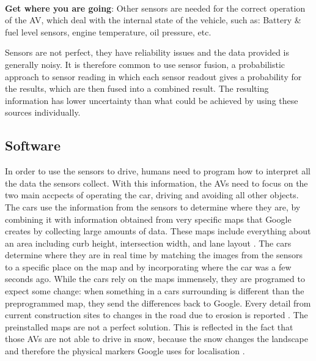 \documentclass[11pt]{article}
\begin{document}
$~$\\
\textbf{Get where you are going}:
Other sensors are needed for the correct operation of the AV, which deal with the internal state of the vehicle, such as: Battery \& fuel level sensors, engine temperature, oil pressure, etc.

Sensors are not perfect, they have reliability issues and the data provided is generally noisy. It is therefore common to use sensor fusion, a probabilistic approach to sensor reading in which each sensor readout gives a probability for the results, which are then fused into a combined result. The resulting information has lower uncertainty than what could be achieved by using these sources individually. \cite{HellstromUmea}

\subsection{Software}
In order to use the sensors to drive, humans need to program how to interpret all the data the sensors collect. With this information, the AVs need to focus on the two main accpects of operating the car, driving and avoiding all other objects. The cars use the information from the sensors to determine where they are, by combining it with information obtained from very specific maps that Google creates by collecting large amounts of data. These maps include everything about an area including curb height, intersection width, and lane layout \cite{chrisurmson2016}.
The cars determine where they are in real time by matching the images from the sensors to a specific place on the map and by incorporating where the car was a few seconds ago. While the cars rely on the maps immensely, they are programed to expect some change: when something in a cars surrounding is different than the preprogrammed map, they send the differences back to Google. Every detail from current construction sites to changes in the road due to erosion is reported \cite{chrisurmson2016}. The preinstalled maps are not a perfect solution. This is reflected in the fact that those AVs are not able to drive in snow, because the snow changes the landscape and therefore the physical markers Google uses for localisation \cite{chrisurmson2016}. 
\end{document}
